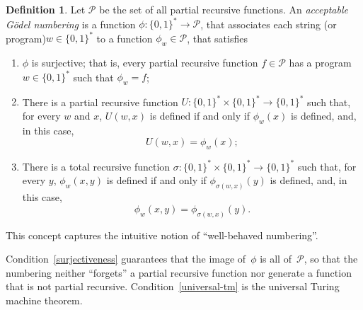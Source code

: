 \documentclass[12pt]{article}
\theoremstyle{definition}
\newtheorem{definition}{Definition}
\begin{document}
\begin{definition}
    Let $\mathcal P$ be the set of all partial recursive functions.
    An \emph{acceptable Gödel numbering}
    is a function $\phi : \{0, 1\}^* \to \mathcal P$,
    that associates each string (or program)\footnotemark $w \in \{0, 1\}^*$
    to a function $\phi_w \in \mathcal P$,
    that satisfies
    \begin{enumerate}
        \item $\phi$ is surjective;
            that is, every partial recursive function $f \in \mathcal P$
            has a program $w \in \{0, 1\}^*$ such that $\phi_w = f$;
            \label{surjectiveness}
        \item There is a partial recursive function
            $U:\{0, 1\}^* \times \{0, 1\}^* \to \{0, 1\}^*$ such that,
            for every $w$ and $x$,
            $U(w, x)$ is defined if and only if $\phi_w(x)$ is defined,
            and, in this case,
            \begin{equation*}
                U(w, x) = \phi_w(x);
            \end{equation*}
            \label{universal-tm}
        \item There is a total recursive function
            $\sigma:\{0, 1\}^* \times \{0, 1\}^* \to \{0, 1\}^*$ such that,
            for every $y$,
            $\phi_w(x, y)$ is defined if and only if $\phi_{\sigma(w, x)}(y)$ is defined,
            and, in this case,
            \begin{equation*}
                \phi_w(x, y) = \phi_{\sigma(w, x)}(y).
            \end{equation*}
            \label{smn-theorem}
    \end{enumerate}
\end{definition}

This concept captures the intuitive notion of
``well-behaved numbering''.

Condition~\ref{surjectiveness}
guarantees that the image of~$\phi$ is all of~$\mathcal P$,
so that the numbering neither ``forgets'' a partial recursive function
nor generate a function that is not partial recursive.
Condition~\ref{universal-tm} is the universal Turing machine theorem.
\end{document}
